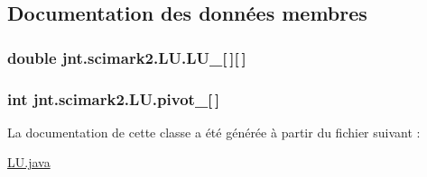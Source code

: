 \subsection{Documentation des données membres}
\hypertarget{classjnt_1_1scimark2_1_1LU_aadbf22a0977a898fe04bb4814a7d3d6b}{
\subsubsection[{L\-U\-\_\-}]{\setlength{\rightskip}{0pt plus 5cm}double jnt.\-scimark2.\-L\-U.\-L\-U\-\_\-\mbox{[}$\,$\mbox{]}\mbox{[}$\,$\mbox{]}\hspace{0.3cm}{\ttfamily [private]}}}\label{classjnt_1_1scimark2_1_1LU_aadbf22a0977a898fe04bb4814a7d3d6b}
\hypertarget{classjnt_1_1scimark2_1_1LU_abd99a699a532c831c657988d297a5aee}{
\subsubsection[{pivot\-\_\-}]{\setlength{\rightskip}{0pt plus 5cm}int jnt.\-scimark2.\-L\-U.\-pivot\-\_\-\mbox{[}$\,$\mbox{]}\hspace{0.3cm}{\ttfamily [private]}}}\label{classjnt_1_1scimark2_1_1LU_abd99a699a532c831c657988d297a5aee}


La documentation de cette classe a été générée à partir du fichier suivant \-:\begin{DoxyCompactItemize}
\item 
\hyperlink{LU_8java}{L\-U.\-java}\end{DoxyCompactItemize}
